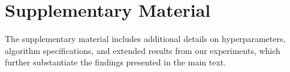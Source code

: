 \documentclass{article} %
\theoremstyle{plain}
\theoremstyle{definition}
\theoremstyle{remark}
\begin{document}



\appendix

\section*{\LARGE Supplementary Material}
\label{sec:appendix}

The supplementary material includes additional details on hyperparameters, algorithm specifications, and extended results from our experiments, which further substantiate the findings presented in the main text.
\end{document}
